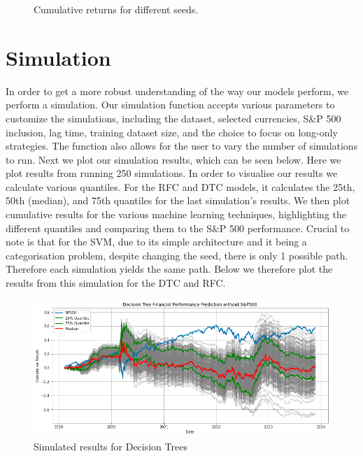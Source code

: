 \begin{figure}[h!]
    \centering
    \caption{Cumulative returns for different seeds.}
    \label{fig: moving_returns}
\end{figure}

\section{Simulation}
\label{Simulation}

In order to get a more robust understanding of the way our models perform, we perform a simulation. Our simulation function accepts various parameters to customize the simulations, including the dataset, selected currencies, S\&P 500 inclusion, lag time, training dataset size, and the choice to focus on long-only strategies. The function also allows for the user to vary the number of simulations to run. Next we plot our simulation results, which can be seen below. Here we plot results from running 250 simulations. 
\newline
\indent In order to visualise our results we calculate various quantiles. For the RFC and DTC models, it calculates the 25th, 50th (median), and 75th quantiles for the last simulation's results. We then plot cumulative results for the various machine learning techniques, highlighting the different quantiles and comparing them to the S\&P 500 performance. Crucial to note is that for the SVM, due to its simple architecture and it being a categorisation problem, despite changing the seed, there is only 1 possible path. Therefore each simulation yields the same path. Below we therefore plot the results from this simulation for the DTC and RFC.
\begin{figure}[h!]
\begin{center}
  \includegraphics[width=\textwidth]{images/dt_sim.png}
  \end{center}
  \caption[Simulated results for Decision Trees]{Simulated results for Decision Trees}
  \label{fig: DTC simulated returns}
\end{figure}

